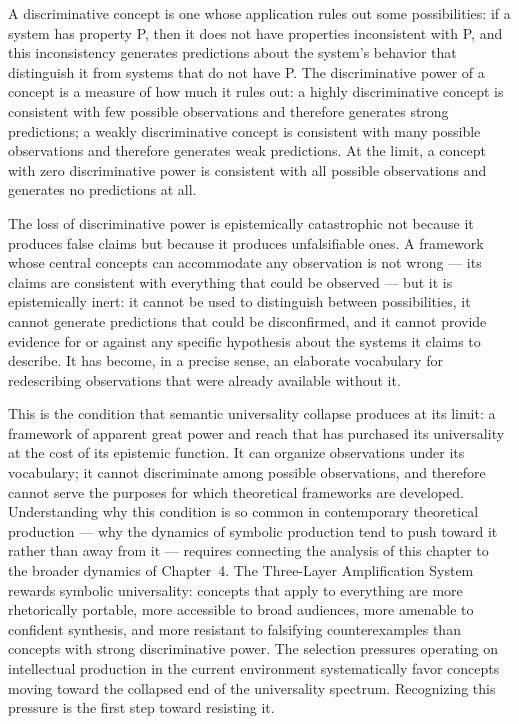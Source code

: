 \documentclass[12pt, openright, twoside]{book}
\begin{document}
A discriminative concept is one whose application
rules out some possibilities: if a system has
property P, then it does not have properties
inconsistent with P, and this inconsistency
generates predictions about the system's behavior
that distinguish it from systems that do not
have P. The discriminative power of a concept
is a measure of how much it rules out: a highly
discriminative concept is consistent with few
possible observations and therefore generates
strong predictions; a weakly discriminative
concept is consistent with many possible
observations and therefore generates weak predictions.
At the limit, a concept with zero discriminative
power is consistent with all possible observations
and generates no predictions at all.

The loss of discriminative power is epistemically
catastrophic not because it produces false claims
but because it produces unfalsifiable ones. A
framework whose central concepts can accommodate
any observation is not wrong --- its claims are
consistent with everything that could be observed
--- but it is epistemically inert: it cannot be
used to distinguish between possibilities, it
cannot generate predictions that could be
disconfirmed, and it cannot provide evidence
for or against any specific hypothesis about
the systems it claims to describe. It has
become, in a precise sense, an elaborate
vocabulary for redescribing observations that
were already available without it.

This is the condition that semantic universality
collapse produces at its limit: a framework
of apparent great power and reach that has
purchased its universality at the cost of
its epistemic function. It can organize observations
under its vocabulary; it cannot discriminate
among possible observations, and therefore
cannot serve the purposes for which theoretical
frameworks are developed. Understanding why
this condition is so common in contemporary
theoretical production --- why the dynamics
of symbolic production tend to push toward
it rather than away from it --- requires
connecting the analysis of this chapter to
the broader dynamics of Chapter~4. The
Three-Layer Amplification System rewards
symbolic universality: concepts that apply
to everything are more rhetorically portable,
more accessible to broad audiences, more
amenable to confident synthesis, and more
resistant to falsifying counterexamples
than concepts with strong discriminative
power. The selection pressures operating
on intellectual production in the current
environment systematically favor concepts
moving toward the collapsed end of the
universality spectrum. Recognizing this
pressure is the first step toward resisting it.
\end{document}
